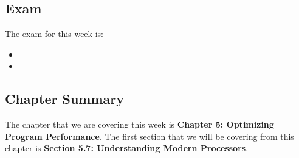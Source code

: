 \subsection{Exam}

The exam for this week is:

\begin{itemize}
    \item {}
    \item {}
\end{itemize}

\subsection{Chapter Summary}

The chapter that we are covering this week is \textbf{Chapter 5: Optimizing Program Performance}. The first section that we will be covering from this chapter is \textbf{Section 5.7: Understanding Modern Processors}.

